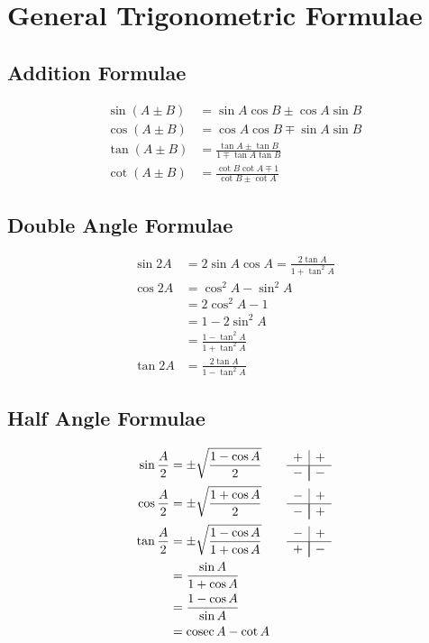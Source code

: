 \documentclass[12pt]{article}
\title{}
\author{}
\date{}
\newcommand{\ppmm}{\begin{array}{c|c}+&+\\\hline\\[-12pt]-&-\end{array}}
\newcommand{\pmpm}{\begin{array}{c|c}-&+\\\hline\\[-12pt]+&-\end{array}}
\newcommand{\pmmp}{\begin{array}{c|c}-&+\\\hline\\[-12pt]-&+\end{array}}
\DeclareMathOperator{\cosec}{cosec}
\newcommand{\pwidth}{0.46\linewidth}
\begin{document}
	
	\maketitle
	
	\section{General Trigonometric Formulae}
	
	\begin{minipage}[t]{\pwidth}
		\subsection{Addition Formulae}
		\begin{align}
			\sin(A \pm B) &= \sin A \cos B \pm \cos A \sin B \\
			\cos(A \pm B) &= \cos A \cos B \mp \sin A \sin B \\
			\tan(A \pm B) &= \frac{\tan A \pm \tan B}{1 \mp \tan A \tan B} \\
			\cot(A \pm B) &= \frac{\cot B \cot A \mp 1}{\cot B \pm \cot A}
		\end{align}
		
		\subsection{Double Angle Formulae}
		\begin{align}
			\sin 2A &= 2 \sin A \cos A = \frac{2 \tan A}{1 + \tan^2A} \\
			\cos 2A &= \cos^2A - \sin^2A \nonumber \\ &= 2\cos^2A - 1 \nonumber\\ &= 1 - 2\sin^2A \nonumber\\ &= \frac{1-\tan^2A}{1 + \tan^2A} \\
			\tan 2A &= \frac{2\tan A}{1- \tan^2A}
		\end{align}
		
		\subsection{Half Angle Formulae}
		\begin{align}
			\sin \frac A2 &= \pm \sqrt{\frac{1-\cos A}{2}} \qquad \ppmm \\
			\cos \frac A2 &= \pm \sqrt{\frac{1+\cos A}{2}} \qquad \pmmp \\
			\tan \frac A2 &= \pm \sqrt{\frac{1-\cos A}{1+\cos A}} \qquad \pmpm \nonumber\\	&= \frac{\sin A}{1+\cos A} \nonumber\\ &= \frac{1-\cos A}{\sin A} \nonumber\\ &= \cosec A - \cot A
		\end{align}


\end{minipage}
\end{document}
